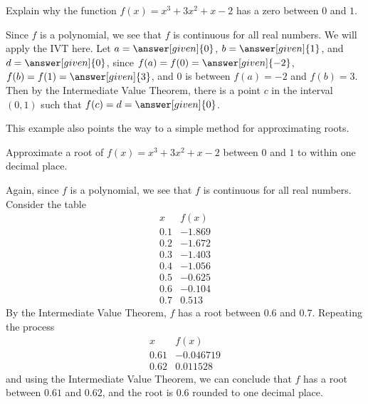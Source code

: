 \documentclass{ximera}
\begin{document}
\begin{example}
	Explain why the function $f(x)=x^3 + 3x^2+x-2$ has a zero between $0$ and $1$.
	
	\begin{explanation}
		Since $f$ is a polynomial, we see that $f$ is continuous for all real
		numbers. We will apply the IVT here. Let   $a=\answer[given]{0}$, $b=\answer[given]{1}$, and $d=\answer[given]{0}$, 
		since $f(a)=f(0)=\answer[given]{-2}$,
		$f(b)=f(1)=\answer[given]{3}$, and $0$ is between $f(a)=-2$ and $f(b)=3$. Then by the
		Intermediate Value Theorem, there is a point $c$ in the interval
		$(0,1)$ such that $f(c)=d=\answer[given]{0}$.
	\end{explanation}
\end{example}



This example also points the way to a simple method for approximating
roots. 



\begin{example} 
	Approximate a root of $f(x) =x^3 + 3x^2+x-2$ between $0$ and $1$ to
	within one decimal place.

	\begin{explanation} 
		Again, since $f$ is a polynomial, we see that $f$ is continuous for
		all real numbers. Consider the table 
		\[
		\begin{array}{c|c}
		  x   & f(x) \\ \hline
		  0.1 & -1.869\\
		  0.2 &-1.672\\
		  0.3 & -1.403\\
		  0.4 & -1.056\\
		  0.5 & -0.625\\
		  0.6 & -0.104\\
		  0.7 & 0.513
		\end{array}
		\]
		By the Intermediate Value Theorem, $f$ has a root between $0.6$ and
		$0.7$. Repeating the process
		\[
		\begin{array}{c|c}
		  x   & f(x) \\ \hline
		  0.61 &-0.046719\\
		  0.62 & 0.011528
		\end{array}
		\]
		and using the Intermediate Value Theorem, we can conclude that $f$ has a root between $0.61$
		and $0.62$, and the root is $0.6$ rounded to one decimal place.
	\end{explanation}
\end{example}
\end{document}
